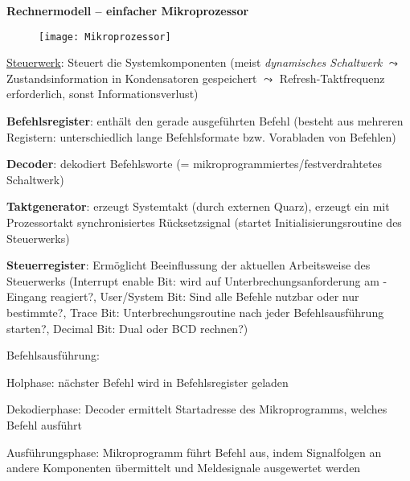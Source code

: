 \textbf{Rechnermodell -- einfacher Mikroprozessor}
\begin{figure}[ht]
  \centering
  \texttt{[image: Mikroprozessor]}
  \label{Mikroprozessor}
\end{figure}
\begin{items}
	\item \underline{\textcolor{red!90!black}{Steuerwerk}}: Steuert die Systemkomponenten (meist \emph{dynamisches Schaltwerk} $\leadsto$ Zustandsinformation in Kondensatoren gespeichert $\leadsto$ Refresh-Taktfrequenz erforderlich, sonst Informationsverlust)
	\begin{enumeration}
		\item \textbf{Befehlsregister}: enthält den gerade ausgeführten Befehl (besteht aus mehreren Registern: unterschiedlich lange Befehlsformate bzw. Vorabladen von Befehlen)
		\item \textbf{Decoder}: dekodiert Befehlsworte (= mikroprogrammiertes/festverdrahtetes Schaltwerk)
		\item \textbf{Taktgenerator}: erzeugt Systemtakt (durch externen Quarz), erzeugt ein mit Prozessortakt synchronisiertes Rücksetzsignal (startet Initialisierungsroutine des Steuerwerks)
		\item \textbf{Steuerregister}: Ermöglicht Beeinflussung der aktuellen Arbeitsweise des Steuerwerks (Interrupt enable Bit: wird auf Unterbrechungsanforderung am -Eingang reagiert?, User/System Bit: Sind alle Befehle nutzbar oder nur bestimmte?, Trace Bit: Unterbrechungsroutine nach jeder Befehlsausführung starten?, Decimal Bit: Dual oder BCD rechnen?)
	\end{enumeration}
	\item Befehlsausführung:
	\begin{enumeration}
		\item Holphase: nächster Befehl wird in Befehlsregister geladen
		\item Dekodierphase: Decoder ermittelt Startadresse des Mikroprogramms, welches Befehl ausführt
		\item Ausführungsphase: Mikroprogramm führt Befehl aus, indem Signalfolgen an andere Komponenten übermittelt und Meldesignale ausgewertet werden
	\end{enumeration}


\end{items}
